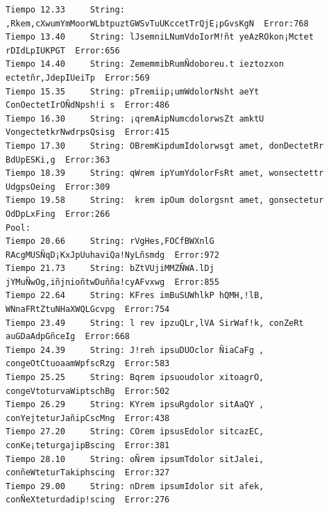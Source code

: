 \documentclass[a4paper,twocolumn,10pt]{article}
\begin{document}
\begin{center}
{\begin{verbatim}
Tiempo 12.33	 String: ,Rkem,cXwumYmMoorWLbtpuztGWSvTuUKccetTrQjE¡pGvsKgN	 Error:768
Tiempo 13.40	 String: lJsemniLNumVdoIorM!ñt yeAzROkon¡Mctet rDIdLpIUKPGT	 Error:656
Tiempo 14.40	 String: ZememmibRumÑdoboreu.t ieztozxon ectetñr,JdepIUeiTp	 Error:569
Tiempo 15.35	 String: pTremiip¡umWdolorNsht aeYt  ConOectetIrOÑdNpsh!i s	 Error:486
Tiempo 16.30	 String: ¡qremAipNumcdolorwsZt amktU VongectetkrNwdrpsQsisg	 Error:415
Tiempo 17.30	 String: OBremKipdumIdolorwsgt amet, donDectetRr BdUpESKi,g	 Error:363
Tiempo 18.39	 String: qWrem ipYumYdolorFsRt amet, wonsectettr UdgpsOeing	 Error:309
Tiempo 19.58	 String:  krem ipOum dolorgsnt amet, gonsectetur OdDpLxFing	 Error:266
Pool:
Tiempo 20.66	 String: rVgHes,FOCfBWXnlG RAcgMUSÑqD¡KxJpUuhaviQa!NyLñsmdg	 Error:972
Tiempo 21.73	 String: bZtVUjiMMZÑWA.lDj jYMuÑwOg,iñjnioñtwDuñña!cyAFvxwg	 Error:855
Tiempo 22.64	 String: KFres imBuSUWhlkP hQMH,!lB, WNnaFRtZtuNHaXWQLGcvpg	 Error:754
Tiempo 23.49	 String: l rev ipzuQLr,lVA SirWaf!k, conZeRt auGDaAdpGñceIg	 Error:668
Tiempo 24.39	 String: J!reh ipsuDUOclor ÑiaCaFg , congeOtCtuoaamWpfscRzg	 Error:583
Tiempo 25.25	 String: Bqrem ipsuoudolor xitoagrO, congeVtoturvaWiptschBg	 Error:502
Tiempo 26.29	 String: KYrem ipsuRgdolor sitAaQY , conYejteturJañipCscMng	 Error:438
Tiempo 27.20	 String: COrem ipsusEdolor sitcazEC, conKe¡teturgajipBscing	 Error:381
Tiempo 28.10	 String: oÑrem ipsumTdolor sitJalei, conñeWteturTakiphscing	 Error:327
Tiempo 29.00	 String: nDrem ipsumIdolor sit afek, conÑeXteturdadip!scing	 Error:276


\end{verbatim}}
\end{center}
\end{document}
